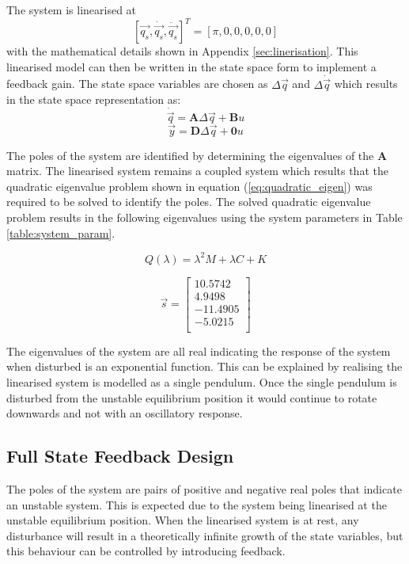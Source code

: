 The system is linearised at 
$$ [\vec{q_{s}},\dot{\vec{q_{s}}},\ddot{\vec{q_{s}}}]^{T}=[\pi,0,0,0,0,0]$$
with the mathematical details shown in Appendix \ref{sec:linerisation}. This linearised model can then be written in the state space form to implement a feedback gain. The state space variables are chosen as $\Delta{\vec{q}}$ and $\Delta{\dot{\vec{q}}}$ which results in the state space representation as:  $$ \dot{\vec{q}} = \boldsymbol{A}\Delta{\vec{q}} + \boldsymbol{B}u $$ $$ \vec{y} = \boldsymbol{D}\Delta{\vec{q}} + \boldsymbol{0}u $$

The poles of the system are identified by determining the eigenvalues of the $\boldsymbol{A}$ matrix. The linearised system remains a coupled system which results that the quadratic eigenvalue problem shown in equation (\ref{eq:quadratic_eigen}) was required to be solved to identify the poles. The solved quadratic eigenvalue problem results in the following eigenvalues using the system parameters in Table \ref{table:system_param}.

\begin{equation} \label{eq:quadratic_eigen}
Q(\lambda) =\lambda^{2}M + \lambda C + K
\end{equation}

$$
\vec{s} = 
\begin{bmatrix}
10.5742 \\
4.9498	\\
-11.4905 \\
-5.0215 \\

\end{bmatrix}
$$

The eigenvalues of the system are all real indicating the response of the system when disturbed is an exponential function. This can be explained by realising the linearised system is modelled as a single pendulum. Once the single pendulum is disturbed from the unstable equilibrium position it would continue to rotate downwards and not with an oscillatory response. 


\subsection{Full State Feedback Design}
The poles of the system are pairs of positive and negative real poles that indicate an unstable system. This is expected due to the system being linearised at the unstable equilibrium position. When the linearised system is at rest, any disturbance will result in a theoretically infinite growth of the state variables, but this behaviour can be controlled by introducing feedback. \\

